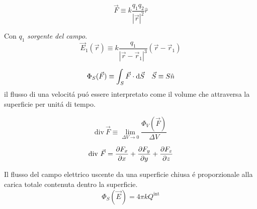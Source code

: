 \begin{multicols}{3}
  \begin{equation}
    \vec{F} \equiv k \frac{q_1q_2}{|\vec{r}|^2}\hat{r}
  \end{equation}

  Con $q_1$ \textit{sorgente del campo}.
  \begin{equation}
    \vec{E}_1(\vec{r}) \equiv k \frac{q_1}{|\vec{r} - \vec{r}_1|^3}(\vec{r} - \vec{r}_1)
  \end{equation}
  
  \begin{equation}
    \Phi_S(\vec{F}) \equiv \int_S \vec{F} \cdot \text{d}\vec{S} \quad \vec{S} \equiv S\hat{n} \\
  \end{equation}
  il flusso di una velocit\'a pu\'o essere interpretato come il volume che attraversa la superficie per unit\'a di tempo.

  \begin{equation}
    \text{div}~\vec{F} \equiv \lim_{\Delta V \to 0} \frac{\Phi_V(\vec{F})}{\Delta V}
  \end{equation}
  
  \begin{equation}
    \text{div}~\vec{F} = \pdv{F_x}{x} + \pdv{F_y}{y} + \pdv{F_z}{z}
  \end{equation}

  Il flusso del campo elettrico uscente da una superficie chiusa \'e proporzionale alla carica totale contenuta dentro la superficie.
  \begin{equation}
    \Phi_S(\vec{E}) = 4\pi k Q^{\text{int}}
  \end{equation}

\end{multicols}


